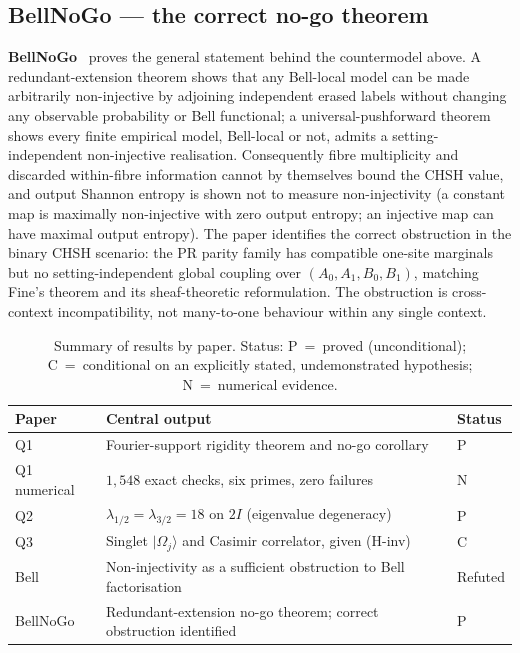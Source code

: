 \documentclass[11pt,a4paper]{article}
\theoremstyle{definition}
\newcommand{\twoI}{2I}
\begin{document}
    \subsection{BellNoGo --- the correct no-go theorem}
      \label{sec:bellnogo}

      \textbf{BellNoGo}~\cite{Beau2026BellNoGo} proves the general statement behind the
      countermodel above. A redundant-extension theorem shows that any Bell-local model can be
      made arbitrarily non-injective by adjoining independent erased labels without changing any
      observable probability or Bell functional; a universal-pushforward theorem shows every
      finite empirical model, Bell-local or not, admits a setting-independent non-injective
      realisation. Consequently fibre multiplicity and discarded within-fibre information cannot
      by themselves bound the CHSH value, and output Shannon entropy is shown not to measure
      non-injectivity (a constant map is maximally non-injective with zero output entropy; an
      injective map can have maximal output entropy). The paper identifies the correct
      obstruction in the binary CHSH scenario: the PR parity family has compatible one-site
      marginals but no setting-independent global coupling over $(A_0,A_1,B_0,B_1)$, matching
      Fine's theorem and its sheaf-theoretic reformulation. The obstruction is cross-context
      incompatibility, not many-to-one behaviour within any single context.

      \begin{table}[ht]
        \centering
        \caption{Summary of results by paper. Status: P~=~proved (unconditional);
        C~=~conditional on an explicitly stated, undemonstrated hypothesis; N~=~numerical
        evidence.}
        \label{tab:papers}
        \renewcommand{\arraystretch}{1.2}
        \begin{tabular}{@{}lll@{}}
          \toprule
          Paper & Central output & Status \\
          \midrule
          Q1 & Fourier-support rigidity theorem and no-go corollary & P \\
          Q1 numerical & $1{,}548$ exact checks, six primes, zero failures & N \\
          Q2 & $\lambda_{1/2} = \lambda_{3/2} = 18$ on $\twoI$ (eigenvalue degeneracy) & P \\
          Q3 & Singlet $|\Omega_j\rangle$ and Casimir correlator, given (H-inv) & C \\
          Bell & Non-injectivity as a sufficient obstruction to Bell factorisation & Refuted \\
          BellNoGo & Redundant-extension no-go theorem; correct obstruction identified & P \\
          \bottomrule
        \end{tabular}
      \end{table}
\end{document}
